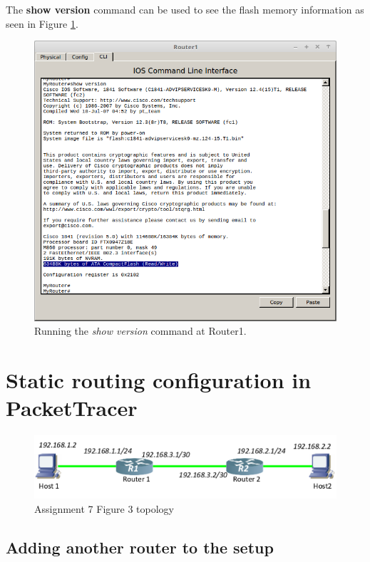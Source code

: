 \documentclass{article}
\begin{document}
The \textbf{show version} command can be used to see the flash memory information as seen in Figure \ref{fig:2routermem}. 
\begin{figure}[h]
\centering
    \includegraphics[scale=0.4]{2routermem}
    \caption{Running the \textit{show version} command at Router1.}
    \label{fig:2routermem}
\end{figure}


\section{Static routing configuration in PacketTracer}


\begin{figure}[h]
    \centering
    \includegraphics[width=\textwidth]{3top}
    \caption{Assignment 7 Figure 3 topology}
    \label{fig:3top}
\end{figure}

\subsection{Adding another router to the setup}
\end{document}
